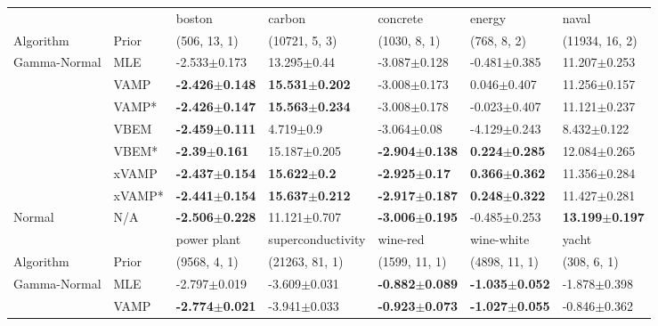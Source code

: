 \begin{tabular}{lllllll}
\toprule
       &     &                     boston &                     carbon &                   concrete &                    energy &                      naval \\
Algorithm & Prior& (506, 13, 1)& (10721, 5, 3)& (1030, 8, 1)& (768, 8, 2)& (11934, 16, 2)\\
\midrule
Gamma-Normal & MLE &           -2.533$\pm$0.173 &            13.295$\pm$0.44 &           -3.087$\pm$0.128 &          -0.481$\pm$0.385 &           11.207$\pm$0.253 \\
       & VAMP &  \textbf{-2.426$\pm$0.148} &  \textbf{15.531$\pm$0.202} &           -3.008$\pm$0.173 &           0.046$\pm$0.407 &           11.256$\pm$0.157 \\
       & VAMP* &  \textbf{-2.426$\pm$0.147} &  \textbf{15.563$\pm$0.234} &           -3.008$\pm$0.178 &          -0.023$\pm$0.407 &           11.121$\pm$0.237 \\
       & VBEM &  \textbf{-2.459$\pm$0.111} &              4.719$\pm$0.9 &            -3.064$\pm$0.08 &          -4.129$\pm$0.243 &            8.432$\pm$0.122 \\
       & VBEM* &   \textbf{-2.39$\pm$0.161} &           15.187$\pm$0.205 &  \textbf{-2.904$\pm$0.138} &  \textbf{0.224$\pm$0.285} &           12.084$\pm$0.265 \\
       & xVAMP &  \textbf{-2.437$\pm$0.154} &    \textbf{15.622$\pm$0.2} &   \textbf{-2.925$\pm$0.17} &  \textbf{0.366$\pm$0.362} &           11.356$\pm$0.284 \\
       & xVAMP* &  \textbf{-2.441$\pm$0.154} &  \textbf{15.637$\pm$0.212} &  \textbf{-2.917$\pm$0.187} &  \textbf{0.248$\pm$0.322} &           11.427$\pm$0.281 \\
Normal & N/A &  \textbf{-2.506$\pm$0.228} &           11.121$\pm$0.707 &  \textbf{-3.006$\pm$0.195} &          -0.485$\pm$0.253 &  \textbf{13.199$\pm$0.197} \\
\midrule
       &     &                power plant &         superconductivity &                   wine-red &                 wine-white &                      yacht \\
Algorithm & Prior& (9568, 4, 1)& (21263, 81, 1)& (1599, 11, 1)& (4898, 11, 1)& (308, 6, 1)\\
\midrule
Gamma-Normal & MLE &           -2.797$\pm$0.019 &          -3.609$\pm$0.031 &  \textbf{-0.882$\pm$0.089} &  \textbf{-1.035$\pm$0.052} &           -1.878$\pm$0.398 \\
       & VAMP &  \textbf{-2.774$\pm$0.021} &          -3.941$\pm$0.033 &  \textbf{-0.923$\pm$0.073} &  \textbf{-1.027$\pm$0.055} &           -0.846$\pm$0.362 \\

\end{tabular}
